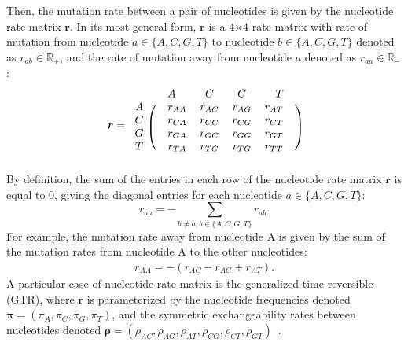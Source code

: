 \documentclass{article}
\newcommand{\CrossMultiply}{\bm{\times}}
\newcommand{\mutmatrix}{r}
\newcommand{\Mutmatrix}{\bm{\mutmatrix}}
\newcommand{\exchan}{\rho}
\newcommand{\Exchan}{\bm{\exchan}}
\newcommand{\mutequi}{\pi}
\newcommand{\Mutequi}{\bm{\mutequi}}
\begin{document}
    Then, the mutation rate between a pair of nucleotides is given by the nucleotide rate matrix $\Mutmatrix$.
    In its most general form, $\Mutmatrix$ is a $4 \CrossMultiply 4$ rate matrix with rate of mutation from nucleotide $a \in \{A, C, G, T\}$ to nucleotide $b \in \{A, C, G, T\}$ denoted as $\mutmatrix_{ab} \in \mathbb{R}_{+}$, and the rate of mutation away from nucleotide $a$ denoted as $\mutmatrix_{aa} \in \mathbb{R}_{-}$:
    \begin{equation}
        \label{eq:mutrates}
        \Mutmatrix =
        \begin{blockarray}{ccccc}
            & A                           & C                       & G                       & T                       \\
            \begin{block}{c(cccc)}
                A & \quad \mutmatrix_{AA} \quad & {\mutmatrix_{AC}} \quad & {\mutmatrix_{AG}} \quad & {\mutmatrix_{AT}} \quad \\
                C & \quad {\mutmatrix_{CA}}     & \mutmatrix_{CC}         & {\mutmatrix_{CG}}       & {\mutmatrix_{CT}}  \quad  \\
                G & \quad {\mutmatrix_{GA}}     & {\mutmatrix_{GC}}       & \mutmatrix_{GG}         & {\mutmatrix_{GT}}   \quad  \\
                T & \quad {\mutmatrix_{TA}}     & {\mutmatrix_{TC}}       & {\mutmatrix_{TG}}       & \mutmatrix_{TT}    \quad    \\
            \end{block}
        \end{blockarray}
    \end{equation}
    By definition, the sum of the entries in each row of the nucleotide rate matrix $\Mutmatrix$ is equal to $0$, giving the diagonal entries for each nucleotide $a \in \{A, C, G, T\}$:
    \begin{equation}
        \mutmatrix_{aa} = - \sum\limits_{ b \neq a, b \in \{A, C, G, T\} } \mutmatrix_{ab}.\label{eq:diag-mutrates}
    \end{equation}
    For example, the mutation rate away from nucleotide A is given by the sum of the mutation rates from nucleotide A to the other nucleotides:
    \begin{align*}
        \mutmatrix_{AA} = - \left( \mutmatrix_{AC} + \mutmatrix_{AG} + \mutmatrix_{AT} \right).
    \end{align*}
    A particular case of nucleotide rate matrix is the generalized time-reversible (GTR), where $\Mutmatrix$ is parameterized by the nucleotide frequencies denoted $\Mutequi = (\mutequi_A , \mutequi_C , \mutequi_G , \mutequi_T)$, and the symmetric exchangeability rates between nucleotides denoted $\Exchan = \left( \exchan_{AC}, \exchan_{AG}, \exchan_{AT}, \exchan_{CG}, \exchan_{CT}, \exchan_{GT}\right)$~\cite{tavare_probabilistic_1986}.
\end{document}
